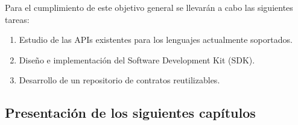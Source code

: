 Para el cumplimiento de este objetivo general se llevarán a cabo las siguientes tareas:

\begin{enumerate}
\item Estudio de las APIs existentes para los lenguajes actualmente soportados.
\item Diseño e implementación del Software Development Kit (SDK).
\item Desarrollo de un repositorio de contratos reutilizables.
\end{enumerate}

\subsection*{Presentación de los siguientes capítulos}	

